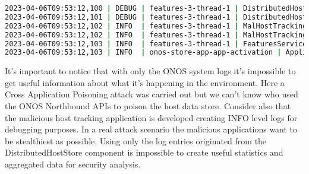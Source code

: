 \documentclass[a4paper,10pt]{memoir}
\begin{document}
\begin{lstlisting}[language=bash]
2023-04-06T09:53:12,100 | DEBUG | features-3-thread-1 | DistributedHostStore             | 192 - org.onosproject.onos-core-dist - 2.7.0 | Removing location of:0000000000000001/1 from host 00:00:00:00:00:01/None
2023-04-06T09:53:12,101 | DEBUG | features-3-thread-1 | DistributedHostStore             | 192 - org.onosproject.onos-core-dist - 2.7.0 | Removing location of:0000000000000003/1 from host 00:00:00:00:00:03/None
2023-04-06T09:53:12,102 | INFO  | features-3-thread-1 | MalHostTracking                  | 215 - org.onosproject.onos-malhosttracking - 2.0.0.SNAPSHOT | Malicious Host Tracking App: Locations successfully poisoned: [of:0000000000000003/1] and [of:0000000000000001/1]
2023-04-06T09:53:12,102 | INFO  | features-3-thread-1 | MalHostTracking                  | 215 - org.onosproject.onos-malhosttracking - 2.0.0.SNAPSHOT | Started malhosttracking App!
2023-04-06T09:53:12,103 | INFO  | features-3-thread-1 | FeaturesServiceImpl              | 11 - org.apache.karaf.features.core - 4.2.9 | Done.
2023-04-06T09:53:12,103 | INFO  | onos-store-app-app-activation | ApplicationManager               | 193 - org.onosproject.onos-core-net - 2.7.0 | Application org.onosproject.malhosttracking has been activated
\end{lstlisting}

It's important to notice that with only the ONOS system logs it's impossible to get useful information about what it's happening in the environment. Here a Cross Application Poisoning attack was carried out but we can't know who used the ONOS Northbound APIs to poison the host data store. Consider also that the malicious host tracking application is developed creating INFO level logs for debugging purposes. In a real attack scenario the malicious applications want to be stealthiest as possible. Using only the log entries originated from the DistributedHostStore component is impossible to create useful statistics and aggregated data for security analysis.
\medskip
\end{document}

